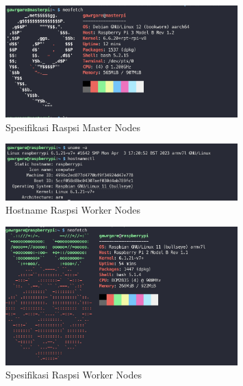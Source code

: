 \begin{figure}[ht]
  \centering
  \includegraphics[width=0.8\textwidth]{resources/chapter-4/pengujian/raspi-master-neofetch.jpg}
  \caption{Spesifikasi Raspsi Master Nodes}
  \label{fig:spesifikasi-raspi-master-nodes}
\end{figure}

\begin{figure}[ht]
  \centering
  \includegraphics[width=0.8\textwidth]{resources/chapter-4/pengujian/raspi-01-worker.jpg}
  \caption{Hostname Raspsi Worker Nodes}
  \label{fig:hostname-raspi-worker-nodes}
\end{figure}

\begin{figure}[ht]
  \centering
  \includegraphics[width=0.8\textwidth]{resources/chapter-4/pengujian/raspi-worker-neofetch.jpg}
  \caption{Spesifikasi Raspsi Worker Nodes}
  \label{fig:spesifikasi-raspi-worker-nodes}
\end{figure}

